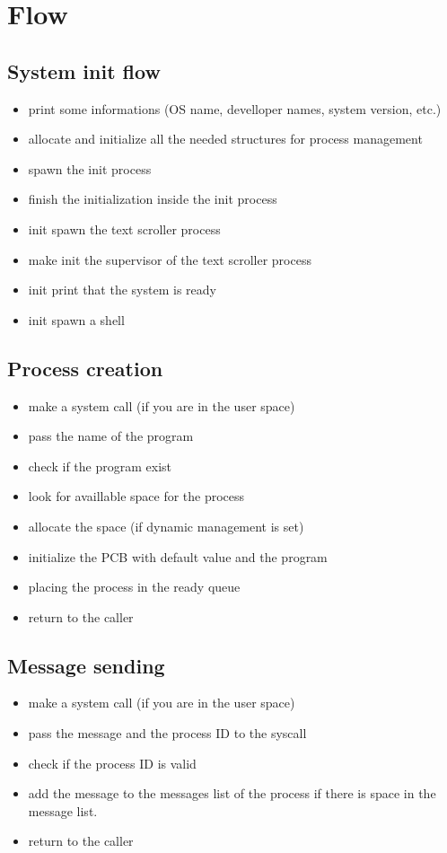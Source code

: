 \chapter{Flow}

\section{System init flow}

\begin{itemize}
  \item print some informations (OS name, develloper names, system version, etc.)
  \item allocate and initialize all the needed structures for process management
  \item spawn the init process
  \item finish the initialization inside the init process
  \item init spawn the text scroller process
  \item make init the supervisor of the text scroller process
  \item init print that the system is ready
  \item init spawn a shell
\end{itemize}

\section{Process creation}

\begin{itemize}
  \item make a system call (if you are in the user space)
  \item pass the name of the program
  \item check if the program exist
  \item look for availlable space for the process
  \item allocate the space (if dynamic management is set)
  \item initialize the PCB with default value and the program
  \item placing the process in the ready queue
  \item return to the caller
\end{itemize}

\section{Message sending}

\begin{itemize}
  \item make a system call (if you are in the user space)
  \item pass the message and the process ID to the syscall
  \item check if the process ID is valid
  \item add the message to the messages list of the process if there is space in the message list.
  \item return to the caller
\end{itemize}
